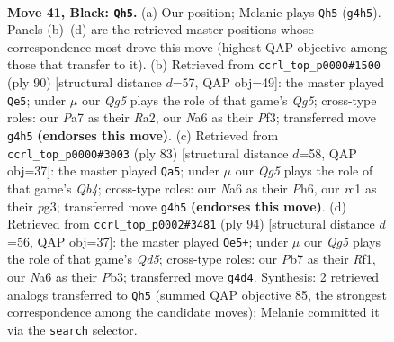 \documentclass[11pt]{article}
\begin{document}
\clearpage

\begin{figure}[p]\centering
\begin{subfigure}{0.46\textwidth}\centering
\resizebox{\linewidth}{!}{%
\newchessgame
\chessboard[
  setfen={r5k1/pp6/n2Q4/2pP1p2/6q1/P5P1/1P3K2/2RR4 b - - 1 41},
  showmover=false,
  pgfstyle=straightmove, color=movearrow, markmove={g4-h5}
]}
\caption{}
\end{subfigure}\hfill
\begin{subfigure}{0.46\textwidth}\centering
\resizebox{\linewidth}{!}{%
\newchessgame
\chessboard[
  setfen={3r4/P2r1p1k/2q3p1/6Qp/8/3p1P1P/R5P1/1R5K w - - 3 46},
  showmover=false,
  pgfstyle=straightmove, color=movearrow, markmove={g5-e5}
]}
\caption{}
\end{subfigure}
\\[4pt]
\begin{subfigure}{0.46\textwidth}\centering
\resizebox{\linewidth}{!}{%
\newchessgame
\chessboard[
  setfen={5r1k/6p1/7p/1q2p3/p3Q2P/5PP1/1P2R1K1/8 b - - 3 42},
  showmover=false,
  pgfstyle=straightmove, color=movearrow, markmove={b5-a5}
]}
\caption{}
\end{subfigure}\hfill
\begin{subfigure}{0.46\textwidth}\centering
\resizebox{\linewidth}{!}{%
\newchessgame
\chessboard[
  setfen={6rk/8/1p5p/p2Q4/2P2p2/1P4qP/P7/5R1K w - - 12 48},
  showmover=false,
  pgfstyle=straightmove, color=movearrow, markmove={d5-e5}
]}
\caption{}
\end{subfigure}
\caption{\textbf{Move 41, Black: \texttt{Qh5}.} (a) Our position; Melanie plays \texttt{Qh5} (\texttt{g4h5}). Panels (b)--(d) are the retrieved master positions whose correspondence most drove this move (highest QAP objective among those that transfer to it). (b) Retrieved from \texttt{ccrl\_top\_p0000\#1500} (ply 90) [structural distance $d$=57, QAP obj=49]: the master played \texttt{Qe5}; under $\mu$ our \emph{Qg5} plays the role of that game's \emph{Qg5}; cross-type roles: our \emph{P}a7 as their \emph{R}a2, our \emph{N}a6 as their \emph{P}f3; transferred move \texttt{g4h5} \textbf{(endorses this move)}. (c) Retrieved from \texttt{ccrl\_top\_p0000\#3003} (ply 83) [structural distance $d$=58, QAP obj=37]: the master played \texttt{Qa5}; under $\mu$ our \emph{Qg5} plays the role of that game's \emph{Qb4}; cross-type roles: our \emph{N}a6 as their \emph{P}h6, our \emph{r}c1 as their \emph{p}g3; transferred move \texttt{g4h5} \textbf{(endorses this move)}. (d) Retrieved from \texttt{ccrl\_top\_p0002\#3481} (ply 94) [structural distance $d$=56, QAP obj=37]: the master played \texttt{Qe5+}; under $\mu$ our \emph{Qg5} plays the role of that game's \emph{Qd5}; cross-type roles: our \emph{P}b7 as their \emph{R}f1, our \emph{N}a6 as their \emph{P}b3; transferred move \texttt{g4d4}. Synthesis: 2 retrieved analogs transferred to \texttt{Qh5} (summed QAP objective 85, the strongest correspondence among the candidate moves); Melanie committed it via the \texttt{search} selector.}
\label{fig:thought-m81}
\end{figure}
\end{document}
